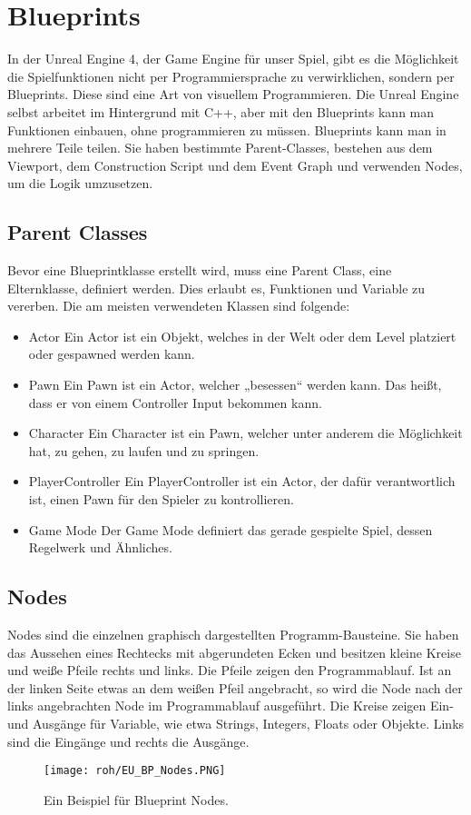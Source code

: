 \section{Blueprints}
In der Unreal Engine 4, der Game Engine für unser Spiel, gibt es die Möglichkeit die Spielfunktionen nicht per Programmiersprache zu verwirklichen, sondern per Blueprints.
Diese sind eine Art von visuellem Programmieren. \citep{ue:BPs}
Die Unreal Engine selbst arbeitet im Hintergrund mit C++, aber mit den Blueprints kann man Funktionen einbauen, ohne programmieren zu müssen. \citep{ue:programming}
Blueprints kann man in mehrere Teile teilen.
Sie haben bestimmte Parent-Classes, bestehen aus dem Viewport, dem Construction Script und dem Event Graph und verwenden Nodes, um die Logik umzusetzen. \citep{ue:BPoverview}
\subsection{Parent Classes}
Bevor eine Blueprintklasse erstellt wird, muss eine Parent Class, eine Elternklasse, definiert werden.
Dies erlaubt es, Funktionen und Variable zu vererben.\citep{ue:BPParents}
Die am meisten verwendeten Klassen sind folgende:
\begin{itemize}
    \item Actor \citep{ue:BPActors}
    Ein Actor ist ein Objekt, welches in der Welt oder dem Level platziert oder gespawned werden kann.
    \item Pawn \citep{ue:BPPawn}
    Ein Pawn ist ein Actor, welcher „besessen“ werden kann.
    Das heißt, dass er von einem Controller Input bekommen kann.
    \item Character \citep{ue:BPCharacter}
    Ein Character ist ein Pawn, welcher unter anderem die Möglichkeit hat, zu gehen, zu laufen und zu springen.
    \item PlayerController \citep{ue:BPPlayerController}
    Ein PlayerController ist ein Actor, der dafür verantwortlich ist, einen Pawn für den Spieler zu kontrollieren.
    \item Game Mode \citep{ue:BPGameMode}
    Der Game Mode definiert das gerade gespielte Spiel, dessen Regelwerk und Ähnliches.
\end{itemize}
\subsection{Nodes}
Nodes sind die einzelnen graphisch dargestellten Programm-Bausteine.\citep{ue:node_introduction}
Sie haben das Aussehen eines Rechtecks mit abgerundeten Ecken und besitzen kleine Kreise und weiße Pfeile rechts und links.
Die Pfeile zeigen den Programmablauf.
Ist an der linken Seite etwas an dem weißen Pfeil angebracht, so wird die Node nach der links angebrachten Node im Programmablauf ausgeführt.
Die Kreise zeigen Ein- und Ausgänge für Variable, wie etwa Strings, Integers, Floats oder Objekte.
Links sind die Eingänge und rechts die Ausgänge.
\raggedbottom
\begin{figure}[H]
    \centering
    \texttt{[image: roh/EU\_BP\_Nodes.PNG]}
    \caption{Ein Beispiel für Blueprint Nodes.}
    \label{UE:BP_Nodes}
\end{figure}
